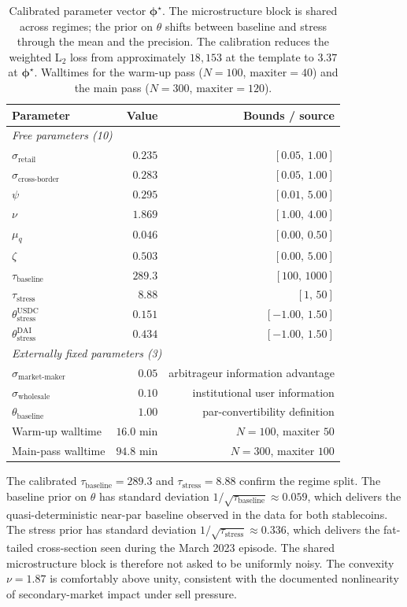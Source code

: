 \begin{table}[h]
\centering
\caption{Calibrated parameter vector $\boldsymbol{\phi}^\star$. The microstructure block is shared across regimes; the prior on $\theta$ shifts between baseline and stress through the mean and the precision. The calibration reduces the weighted L$_2$ loss from approximately $18{,}153$ at the template to $3.37$ at $\boldsymbol{\phi}^\star$. Walltimes for the warm-up pass ($N=100$, $\text{maxiter}=40$) and the main pass ($N=300$, $\text{maxiter}=120$).}
\label{tab:phi_star}
\begin{tabular}{lrr}
\toprule
Parameter & Value & Bounds / source \\
\midrule
\multicolumn{3}{l}{\emph{Free parameters (10)}} \\
$\sigma_{\text{retail}}$ & $0.235$ & $[0.05,\,1.00]$ \\
$\sigma_{\text{cross-border}}$ & $0.283$ & $[0.05,\,1.00]$ \\
$\psi$ & $0.295$ & $[0.01,\,5.00]$ \\
$\nu$ & $1.869$ & $[1.00,\,4.00]$ \\
$\mu_q$ & $0.046$ & $[0.00,\,0.50]$ \\
$\zeta$ & $0.503$ & $[0.00,\,5.00]$ \\
$\tau_{\text{baseline}}$ & $289.3$ & $[100,\,1000]$ \\
$\tau_{\text{stress}}$ & $8.88$ & $[1,\,50]$ \\
$\theta_{\text{stress}}^{\text{USDC}}$ & $0.151$ & $[-1.00,\,1.50]$ \\
$\theta_{\text{stress}}^{\text{DAI}}$ & $0.434$ & $[-1.00,\,1.50]$ \\
\midrule
\multicolumn{3}{l}{\emph{Externally fixed parameters (3)}} \\
$\sigma_{\text{market-maker}}$ & $0.05$ & arbitrageur information advantage \\
$\sigma_{\text{wholesale}}$ & $0.10$ & institutional user information \\
$\theta_{\text{baseline}}$ & $1.00$ & par-convertibility definition \\
\midrule
Warm-up walltime & $16.0$ min & $N=100$, maxiter $50$ \\
Main-pass walltime & $94.8$ min & $N=300$, maxiter $100$ \\
\bottomrule
\end{tabular}
\end{table}

The calibrated $\tau_{\text{baseline}} = 289.3$ and $\tau_{\text{stress}} = 8.88$ confirm the regime split. The baseline prior on $\theta$ has standard deviation $1/\sqrt{\tau_{\text{baseline}}} \approx 0.059$, which delivers the quasi-deterministic near-par baseline observed in the data for both stablecoins. The stress prior has standard deviation $1/\sqrt{\tau_{\text{stress}}} \approx 0.336$, which delivers the fat-tailed cross-section seen during the March 2023 episode. The shared microstructure block is therefore not asked to be uniformly noisy. The convexity $\nu = 1.87$ is comfortably above unity, consistent with the documented nonlinearity of secondary-market impact under sell pressure.

